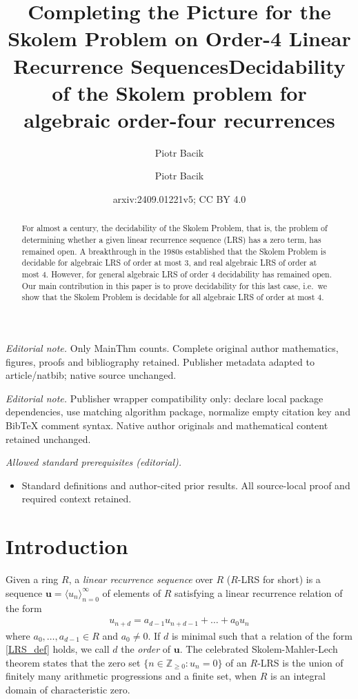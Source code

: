 \documentclass{article}\usepackage[a4paper,margin=20mm]{geometry}
\title{Completing the Picture for the Skolem Problem on Order-4 Linear Recurrence Sequences}
\author{Piotr Bacik}\date{}
\title{Decidability of the Skolem problem for algebraic order-four recurrences}
\author{Piotr Bacik}
\date{arxiv:2409.01221v5; CC BY 4.0}
\newcommand{\Z}{\mathbb{Z}}
\newcommand{\LRS}[1]{{\bm{#1}}}
\begin{document}
\maketitle
\noindent\textit{Editorial note.} Only MainThm counts. Complete original author mathematics, figures, proofs and bibliography retained. Publisher metadata adapted to article/natbib; native source unchanged.\par\medskip
\noindent\textit{Editorial note.} Publisher wrapper compatibility only: declare local package dependencies, use matching algorithm package, normalize empty citation key and BibTeX comment syntax. Native author originals and mathematical content retained unchanged.\par\medskip
\noindent\textit{Allowed standard prerequisites (editorial).}\begin{itemize}
\item Standard definitions and author-cited prior results. All source-local proof and required context retained.
\end{itemize}\medskip
\maketitle
\begin{abstract}
For almost a century, the decidability of the Skolem Problem, that is, the problem of determining whether a given linear recurrence sequence (LRS) has a zero term, has remained open. A breakthrough in the 1980s established that the Skolem Problem is decidable for algebraic LRS of order at most 3, and real algebraic LRS of order at most 4. However, for general algebraic LRS of order 4 decidability has remained open. Our main contribution in this paper is to prove decidability for this last case, i.e.\ we show that the Skolem Problem is decidable for all algebraic LRS of order at most 4. 
\end{abstract}
\section{Introduction}
Given a ring $R$, a \emph{linear recurrence sequence} over $R$ ($R$-LRS for short) is a sequence $\LRS{u} = \langle u_n \rangle_{n=0}^\infty$ of elements of $R$ satisfying a linear recurrence relation of the form
\begin{align} \label{LRS_def}
	u_{n+d} = a_{d-1} u_{n+d-1} + \dots + a_0 u_n
\end{align}
where $a_0, \dots , a_{d-1} \in R$ and $a_0 \neq 0$. If $d$ is minimal such that a relation of the form \eqref{LRS_def} holds, we call $d$ the \emph{order} of $\LRS{u}$. The celebrated Skolem-Mahler-Lech theorem \cite{Skolem_SML,Mahler_SML,lech_note_1953} states that the zero set $\{n \in \Z_{\geq 0} : u_n = 0\}$ of an $R$-LRS is the union of finitely many arithmetic progressions and a finite set, when $R$ is an integral domain of characteristic zero. 
\end{document}
